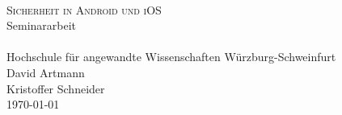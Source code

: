 \begin{titlepage}
   	\mbox{}\vspace{5\baselineskip}\\
   	\rmfamily\huge
   	\centering
	\textsc{Sicherheit in Android und iOS}
	\\[3ex]
   	Seminararbeit
   	\rmfamily\Large
   	\vspace{1\baselineskip}\\
   	\mbox{}
	\vspace{3\baselineskip}\\
	Hochschule für angewandte Wissenschaften Würzburg-Schweinfurt
   	\vspace{5\baselineskip}\\
   	\rmfamily\Large
   	David Artmann\\
   	\rmfamily\Large
   	Kristoffer Schneider
   	\vspace{1\baselineskip}\\
   	\today
\end{titlepage}